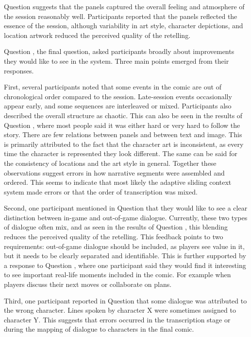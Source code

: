Question  suggests that the panels captured the overall feeling and atmosphere of the session reasonably well. Participants reported that the panels reflected the essence of the session, although variability in art style, character depictions, and location artwork reduced the perceived quality of the retelling.

Question , the final question, asked participants broadly about improvements they would like to see in the system. Three main points emerged from their responses.

First, several participants noted that some events in the comic are out of chronological order compared to the session. Late-session events occasionally appear early, and some sequences are interleaved or mixed. Participants also described the overall structure as chaotic. This can also be seen in the results of Question , where most people said it was either hard or very hard to follow the story. There are few relations between panels and between text and image. This is primarily attributed to the fact that the character art is inconsistent, as every time the character is represented they look different. The same can be said for the consistency of locations and the art style in general. Together these observations suggest errors in how narrative segments were assembled and ordered. This seems to indicate that most likely the adaptive sliding context system made errors or that the order of transcription was mixed.

Second, one participant mentioned in Question  that they would like to see a clear distinction between in-game and out-of-game dialogue. Currently, these two types of dialogue often mix, and as seen in the results of Question , this blending reduces the perceived quality of the retelling. This feedback points to two requirements: out-of-game dialogue should be included, as players see value in it, but it needs to be clearly separated and identifiable. This is further supported by a response to Question , where one participant said they would find it interesting to see important real-life moments included in the comic. For example when players discuss their next moves or collaborate on plans.

Third, one participant reported in Question  that some dialogue was attributed to the wrong character. Lines spoken by character X were sometimes assigned to character Y. This suggests that errors occurred in the transcription stage or during the mapping of dialogue to characters in the final comic.

